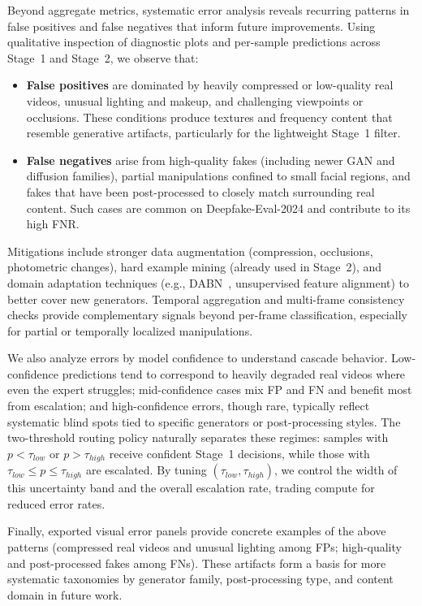 Beyond aggregate metrics, systematic error analysis reveals recurring patterns in false positives and false negatives that inform future improvements. Using qualitative inspection of diagnostic plots and per\hyp sample predictions across Stage~1 and Stage~2, we observe that:
\begin{itemize}[leftmargin=*,itemsep=2pt,parsep=0pt]
  \item \textbf{False positives} are dominated by heavily compressed or low\hyp quality real videos, unusual lighting and makeup, and challenging viewpoints or occlusions. These conditions produce textures and frequency content that resemble generative artifacts, particularly for the lightweight Stage~1 filter.
  \item \textbf{False negatives} arise from high\hyp quality fakes (including newer GAN and diffusion families), partial manipulations confined to small facial regions, and fakes that have been post\hyp processed to closely match surrounding real content. Such cases are common on Deepfake\hyp Eval\hyp 2024 and contribute to its high FNR.
\end{itemize}
Mitigations include stronger data augmentation (compression, occlusions, photometric changes), hard example mining (already used in Stage~2), and domain adaptation techniques (e.g., DA\-BN~\cite{li2021dabn}, unsupervised feature alignment) to better cover new generators. Temporal aggregation and multi\hyp frame consistency checks provide complementary signals beyond per\hyp frame classification, especially for partial or temporally localized manipulations.

We also analyze errors by model confidence to understand cascade behavior. Low\hyp confidence predictions tend to correspond to heavily degraded real videos where even the expert struggles; mid\hyp confidence cases mix FP and FN and benefit most from escalation; and high\hyp confidence errors, though rare, typically reflect systematic blind spots tied to specific generators or post\hyp processing styles. The two\hyp threshold routing policy naturally separates these regimes: samples with $p < \tau_{low}$ or $p > \tau_{high}$ receive confident Stage~1 decisions, while those with $\tau_{low} \le p \le \tau_{high}$ are escalated. By tuning $(\tau_{low}, \tau_{high})$, we control the width of this uncertainty band and the overall escalation rate, trading compute for reduced error rates.

Finally, exported visual error panels provide concrete examples of the above patterns (compressed real videos and unusual lighting among FPs; high\hyp quality and post\hyp processed fakes among FNs). These artifacts form a basis for more systematic taxonomies by generator family, post\hyp processing type, and content domain in future work.

